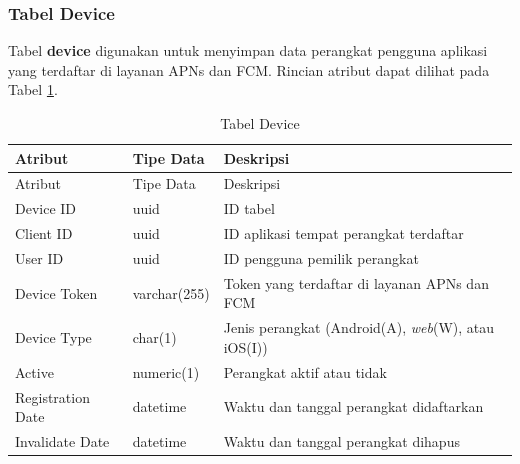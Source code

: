 \subsubsection{Tabel Device}
\par Tabel \textbf{device} digunakan untuk menyimpan data perangkat pengguna aplikasi yang terdaftar di layanan APNs dan FCM. Rincian atribut dapat dilihat pada Tabel \ref{tabel_device}.
\begin{longtable}{|p{2cm}|p{2.5cm}|p{4.5cm}|}
	\caption{Tabel Device} \label{tabel_device} \\ \hline
    \rowcolor{lightgray} {Atribut} & {Tipe Data} & {Deskripsi} \\ \hline
    \endfirsthead
    \hline
    \rowcolor{lightgray} {Atribut} & {Tipe Data} & {Deskripsi} \\ \hline
    \endhead
    Device ID & uuid & ID tabel \\ \hline
    Client ID & uuid & ID aplikasi tempat perangkat terdaftar \\ \hline
    User ID & uuid & ID pengguna pemilik perangkat \\ \hline
    Device Token & varchar(255) & Token yang terdaftar di layanan APNs dan FCM \\ \hline
    Device Type & char(1) & Jenis perangkat (Android(A), \textit{web}(W), atau iOS(I)) \\ \hline
    Active & numeric(1) & Perangkat aktif atau tidak \\ \hline
    Registration Date & datetime & Waktu dan tanggal perangkat didaftarkan \\ \hline
    Invalidate Date & datetime & Waktu dan tanggal perangkat dihapus \\ \hline
\end{longtable}

